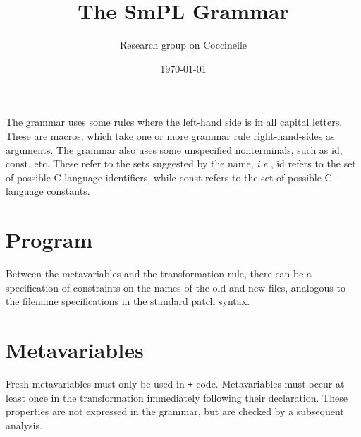 \documentclass{article}
\title{The SmPL Grammar}
\author{Research group on Coccinelle}
\date{\today}
\begin{document}
\maketitle



The grammar uses some rules where the left-hand side is in all capital
letters.  These are macros, which take one or more grammar rule
right-hand-sides as arguments.  The grammar also uses some unspecified
nonterminals, such as {\sf id}, {\sf const}, etc.  These refer to the sets
suggested by the name, {\em i.e.}, {\sf id} refers to the set of possible
C-language identifiers, while {\sf const} refers to the set of possible
C-language constants.

\section{Program}

\begin{grammar}

  

\end{grammar}

Between the metavariables and the transformation rule, there can be a
specification of constraints on the names of the old and new files,
analogous to the filename specifications in the standard patch syntax.

\section{Metavariables}

Fresh metavariables must only be used in {\tt +} code.  Metavariables must
occur at least once in the transformation immediately following their
declaration.  These properties are not expressed in the grammar, but are
checked by a subsequent analysis.
\end{document}
